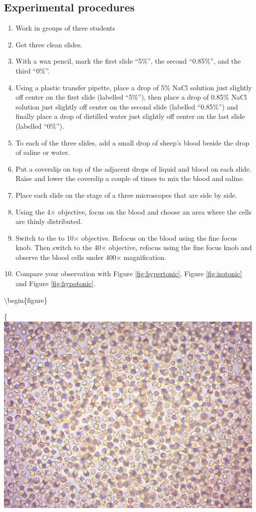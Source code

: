 \subsection{Experimental procedures}\label{experimental-procedures-18}

\begin{enumerate}
\def\labelenumi{\arabic{enumi}.}
\tightlist
\item
  Work in groups of three students
\item
  Get three clean slides.
\item
  With a wax pencil, mark the first slide ``5\%'', the second
  ``0.85\%'', and the third ``0\%''.
\item
  Using a plastic transfer pipette, place a drop of 5\% NaCl solution
  just slightly off center on the first slide (labelled ``5\%''), then
  place a drop of 0.85\% NaCl solution just slightly off center on the
  second slide (labelled ``0.85\%'') and finally place a drop of
  distilled water just slightly off center on the last slide (labelled
  ``0\%'').
\item
  To each of the three slides, add a small drop of sheep's blood beside
  the drop of saline or water.
\item
  Put a coverslip on top of the adjacent drops of liquid and blood on
  each slide. Raise and lower the coverslip a couple of times to mix the
  blood and saline.
\item
  Place each slide on the stage of a three microscopes that are side by
  side.
\item
  Using the 4× objective, focus on the blood and choose an area where
  the cells are thinly distributed.
\item
  Switch to the to 10× objective. Refocus on the blood using the fine
  focus knob. Then switch to the 40× objective, refocus using the fine
  focus knob and observe the blood cells under 400× magnification.
\item
  Compare your observation with Figure \ref{fig:hypertonic}, Figure
  \ref{fig:isotonic} and Figure \ref{fig:hypotonic}.
\end{enumerate}

\textbackslash{}begin\{figure\}

\{\centering \includegraphics[width=0.7\linewidth]{./figures/exchange/blood_hypertonic}

